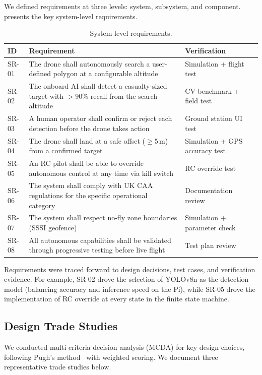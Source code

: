 We defined requirements at three levels: system, subsystem, and component.  presents the key system-level requirements.

\begin{table}[htbp]
\centering
\compactTable
\caption{System-level requirements.}
\label{tab:requirements}
\begin{tabularx}{\linewidth}{l X l}
\toprule
\textbf{ID} & \textbf{Requirement} & \textbf{Verification} \\
\midrule
SR-01 & The drone shall autonomously search a user-defined polygon at a configurable altitude & Simulation + flight test \\
SR-02 & The onboard AI shall detect a casualty-sized target with $>$90\% recall from the search altitude & CV benchmark + field test \\
SR-03 & A human operator shall confirm or reject each detection before the drone takes action & Ground station UI test \\
SR-04 & The drone shall land at a safe offset ($\geq$5\,m) from a confirmed target & Simulation + GPS accuracy test \\
SR-05 & An RC pilot shall be able to override autonomous control at any time via kill switch & RC override test \\
SR-06 & The system shall comply with UK CAA regulations for the specific operational category~\cite{ukcaa, cap722} & Documentation review \\
SR-07 & The system shall respect no-fly zone boundaries (SSSI geofence) & Simulation + parameter check \\
SR-08 & All autonomous capabilities shall be validated through progressive testing before live flight & Test plan review \\
\bottomrule
\end{tabularx}
\end{table}

Requirements were traced forward to design decisions, test cases, and verification evidence. For example, SR-02 drove the selection of YOLOv8n as the detection model (balancing accuracy and inference speed on the Pi), while SR-05 drove the implementation of RC override at every state in the finite state machine.

\subsection{Design Trade Studies}

We conducted multi-criteria decision analysis (MCDA) for key design choices, following Pugh's method~\cite{pugh1991total} with weighted scoring. We document three representative trade studies below.

